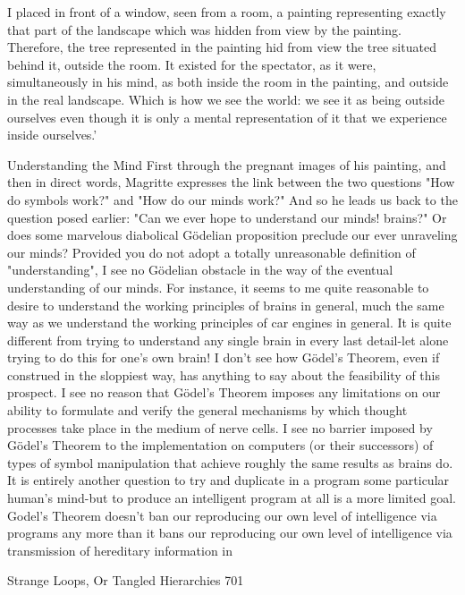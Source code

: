    I placed in front of a window, seen from a room, a painting representing exactly
   that part of the landscape which was hidden from view by the painting. Therefore,
   the tree represented in the painting hid from view the tree situated behind it, outside
   the room. It existed for the spectator, as it were, simultaneously in his mind, as both
   inside the room in the painting, and outside in the real landscape. Which is how we
   see the world: we see it as being outside ourselves even though it is only a mental
   representation of it that we
   experience inside ourselves.'

                              Understanding the Mind
First through the pregnant images of his painting, and then in direct words, Magritte
expresses the link between the two questions "How do symbols work?" and "How do our
minds work?" And so he leads us back to the question posed earlier: "Can we ever hope
to understand our minds! brains?"
        Or does some marvelous diabolical Gödelian proposition preclude our ever
unraveling our minds? Provided you do not adopt a totally unreasonable definition of
"understanding", I see no Gödelian obstacle in the way of the eventual understanding of
our minds. For instance, it seems to me quite reasonable to desire to understand the
working principles of brains in general, much the same way as we understand the
working principles of car engines in general. It is quite different from trying to
understand any single brain in every last detail-let alone trying to do this for one's own
brain! I don't see how Gödel’s Theorem, even if construed in the sloppiest way, has
anything to say about the feasibility of this prospect. I see no reason that Gödel’s
Theorem imposes any limitations on our ability to formulate and verify the general
mechanisms by which thought processes take place in the medium of nerve cells. I see no
barrier imposed by Gödel’s Theorem to the implementation on computers (or their
successors) of types of symbol manipulation that achieve roughly the same results as
brains do. It is entirely another question to try and duplicate in a program some particular
human's mind-but to produce an intelligent program at all is a more limited goal. Godel's
Theorem doesn't ban our reproducing our own level of intelligence via programs any
more than it bans our reproducing our own level of intelligence via transmission of
hereditary information in




Strange Loops, Or Tangled Hierarchies                                                    701

